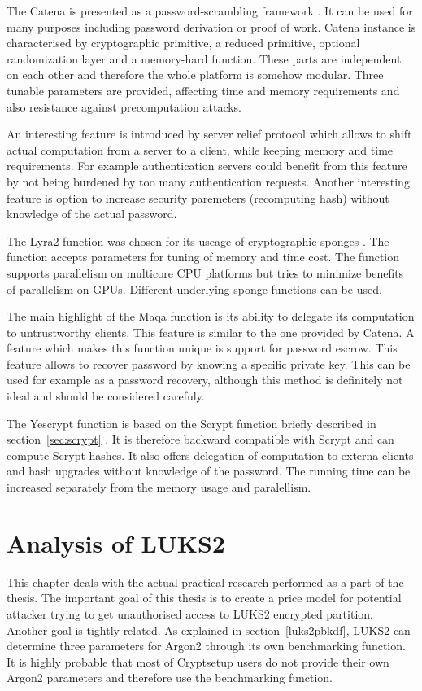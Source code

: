 \documentclass[nolof]{fithesis3}
\begin{document}
The Catena is presented as a password-scrambling framework \parencite{catena}. It can be used for many purposes including password derivation or proof of work. Catena instance is characterised by cryptographic primitive, a reduced primitive, optional randomization layer and a memory-hard function. These parts are independent on each other and therefore the whole platform is somehow modular. Three tunable parameters are provided, affecting time and memory requirements and also resistance against precomputation attacks.

An interesting feature is introduced by server relief protocol which allows to shift actual computation from a server to a client, while keeping memory and time requirements. For example authentication servers could benefit from this feature by not being burdened by too many authentication requests. Another interesting feature is option to increase security paremeters (recomputing hash) without knowledge of the actual password.

The Lyra2 function was chosen for its useage of cryptographic sponges \parencite{lyra2}. The function accepts parameters for tuning of memory and time cost. The function supports parallelism on multicore CPU platforms but tries to minimize benefits of parallelism on GPUs. Different underlying sponge functions can be used.

The main highlight of the Maqa function is its ability to delegate its computation to untrustworthy clients. This feature is similar to the one provided by Catena. A feature which makes this function unique is support for password escrow. This feature allows to recover password by knowing a specific private key. This can be used for example as a password recovery, although this method is definitely not ideal and should be considered carefuly.

The Yescrypt function is based on the Scrypt function briefly described in section~\ref{sec:scrypt} \parencite{yescrypt}. It is therefore backward compatible with Scrypt and can compute Scrypt hashes. It also offers delegation of computation to externa clients and hash upgrades without knowledge of the password. The running time can be increased separately from the memory usage and paralellism.


\chapter{Analysis of LUKS2}
\label{chap:analysis}
This chapter deals with the actual practical research performed as a part of the thesis. The important goal of this thesis is to create a price model for potential attacker trying to get unauthorised access to LUKS2 encrypted partition. Another goal is tightly related. As explained in section~\ref{luks2pbkdf}, LUKS2 can determine three parameters for Argon2 through its own benchmarking function. It is highly probable that most of Cryptsetup users do not provide their own Argon2 parameters and therefore use the benchmarking function.
\end{document}
